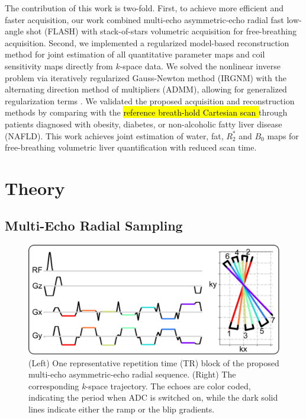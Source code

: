 \documentclass[journal,twoside,web]{ieeecolor}
\begin{document}
The contribution of this work is two-fold.
First, to achieve more efficient and faster acquisition, 
our work combined multi-echo asymmetric-echo radial fast low-angle shot (FLASH) 
with stack-of-stars volumetric acquisition \cite{block_2014_rad}
for free-breathing acquisition. 
Second, we implemented a regularized model-based reconstruction method 
for joint estimation of all quantitative parameter maps 
and coil sensitivity maps directly from $k$-space data. 
We solved the nonlinear inverse problem via 
iteratively regularized Gauss-Newton method (IRGNM) \cite{uecker_2008_nlinv} 
with the alternating direction method of multipliers (ADMM), 
allowing for generalized regularization terms \cite{boyd_2010_admm}. 
We validated the proposed acquisition and reconstruction methods by 
comparing with the \hl{reference breath-hold Cartesian scan \mbox{\cite{zhong_2014_wfadafit}}} 
through patients diagnosed with obesity, diabetes, or non-alcoholic fatty liver disease (NAFLD). 
This work achieves joint estimation of water, fat, $R_2^*$ and $B_0$ maps for free-breathing volumetric liver 
quantification with reduced scan time.



\section{Theory}

\subsection{Multi-Echo Radial Sampling}

\begin{figure}
	\centering
	\includegraphics[width=\columnwidth]{../../figures/tan1.pdf}
	\caption{(Left) One representative repetition time (TR) block of 
		the proposed multi-echo asymmetric-echo radial sequence. 
		(Right) The corresponding \textit{k}-space trajectory. 
		The echoes are color coded, indicating the period when ADC is switched on, 
		while the dark solid lines indicate either the ramp or the blip gradients.}
	\label{FIG:SEQ}
\end{figure}
\end{document}
